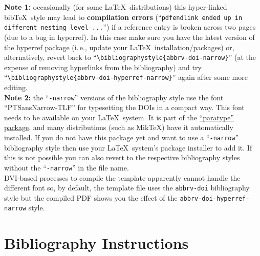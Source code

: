 \documentclass[review,journal]{vgtc}         %
\begin{document}
\begin{itemize}
\textbf{Note 1:} occasionally (for some \LaTeX\ distributions) this hyper-linked bib\TeX\ style may lead to \textbf{compilation errors} (``\texttt{pdfendlink ended up in different nesting level ...}'') if a reference entry is broken across two pages (due to a bug in hyperref). In this case make sure you have the latest version of the hyperref package (i.\,e., update your \LaTeX\ installation/packages) or, alternatively, revert back to ``\texttt{\textbackslash bibliographystyle\{abbrv-doi-narrow\}}'' (at the expense of removing hyperlinks from the bibliography) and try ``\texttt{\textbackslash bibliographystyle\{abbrv-doi-hyperref-narrow\}}'' again after some more editing.\\[1em]
\textbf{Note 2:} the ``\texttt{-narrow}'' versions of the bibliography style use the font ``PTSansNarrow-TLF'' for typesetting the DOIs in a compact way. This font needs to be available on your \LaTeX\ system. It is part of the \href{https://www.ctan.org/pkg/paratype}{``paratype'' package}, and many distributions (such as MikTeX) have it automatically installed. If you do not have this package yet and want to use a ``\texttt{-narrow}'' bibliography style then use your \LaTeX\ system's package installer to add it. If this is not possible you can also revert to the respective bibliography styles without the ``\texttt{-narrow}'' in the file name.\\[1em]
DVI-based processes to compile the template apparently cannot handle the different font so, by default, the template file uses the \texttt{abbrv-doi} bibliography style but the compiled PDF shows you the effect of the \texttt{abbrv-doi-hyperref-narrow} style.
\end{itemize}

\section{Bibliography Instructions}
\end{document}
